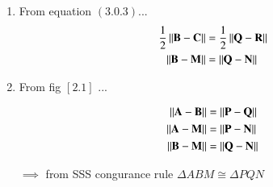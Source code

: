 \begin{enumerate}[label=\thesection.\arabic*.,ref=\thesection.\theenumi]

%
\item From equation $\left(3.0.3\right)$... 
%
\begin{align}
\frac{1}{2}\left\lVert\mathbf{B}-\mathbf{C}\right\rVert &= \frac{1}{2}\left\lVert\mathbf{Q}-\mathbf{R}\right\rVert
 \\
 \left\lVert\mathbf{B}-\mathbf{M}\right\rVert &= \left\lVert\mathbf{Q}-\mathbf{N}\right\rVert
\end{align}

\item From fig $\left[2.1\right]$ ...

\begin{align}
\left\lVert\mathbf{A}-\mathbf{B}\right\rVert &= \left\lVert\mathbf{P}-\mathbf{Q}\right\rVert 
\\ 
\left\lVert\mathbf{A}-\mathbf{M}\right\rVert &= \left\lVert\mathbf{P}-\mathbf{N}\right\rVert
\\
\left\lVert\mathbf{B}-\mathbf{M}\right\rVert &= \left\lVert\mathbf{Q}-\mathbf{N}\right\rVert
\end{align}

$\implies$ from SSS congurance rule $\Delta ABM \cong \Delta PQN$
\end{enumerate}
